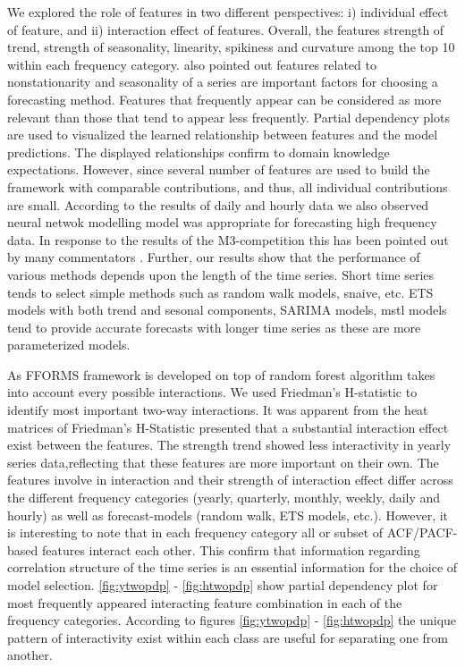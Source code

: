 \documentclass[11pt,a4paper,]{article}
\begin{document}
We explored the role of features in two different perspectives: i)
individual effect of feature, and ii) interaction effect of features.
Overall, the features strength of trend, strength of seasonality,
linearity, spikiness and curvature among the top 10 within each
frequency category. \textcite{lemke2010meta} also pointed out features
related to nonstationarity and seasonality of a series are important
factors for choosing a forecasting method. Features that frequently
appear can be considered as more relevant than those that tend to appear
less frequently. Partial dependency plots are used to visualized the
learned relationship between features and the model predictions. The
displayed relationships confirm to domain knowledge expectations.
However, since several number of features are used to build the
framework with comparable contributions, and thus, all individual
contributions are small. According to the results of daily and hourly
data we also observed neural netwok modelling model was appropriate for
forecasting high frequency data. In response to the results of the
M3-competition this has been pointed out by many commentators
\autocite{makridakis2000m3}. Further, our results show that the
performance of various methods depends upon the length of the time
series. Short time series tends to select simple methods such as random
walk models, snaive, etc. ETS models with both trend and sesonal
components, SARIMA models, mstl models tend to provide accurate
forecasts with longer time series as these are more parameterized
models.

As FFORMS framework is developed on top of random forest algorithm takes
into account every possible interactions. We used Friedman's H-statistic
to identify most important two-way interactions. It was apparent from
the heat matrices of Friedman's H-Statistic presented that a substantial
interaction effect exist between the features. The strength trend showed
less interactivity in yearly series data,reflecting that these features
are more important on their own. The features involve in interaction and
their strength of interaction effect differ across the different
frequency categories (yearly, quarterly, monthly, weekly, daily and
hourly) as well as forecast-models (random walk, ETS models, etc.).
However, it is interesting to note that in each frequency category all
or subset of ACF/PACF-based features interact each other. This confirm
that information regarding correlation structure of the time series is
an essential information for the choice of model selection.
\autoref{fig:ytwopdp} - \autoref{fig:htwopdp} show partial dependency
plot for most frequently appeared interacting feature combination in
each of the frequency categories. According to figures
\autoref{fig:ytwopdp} - \autoref{fig:htwopdp} the unique pattern of
interactivity exist within each class are useful for separating one from
another.
\end{document}
